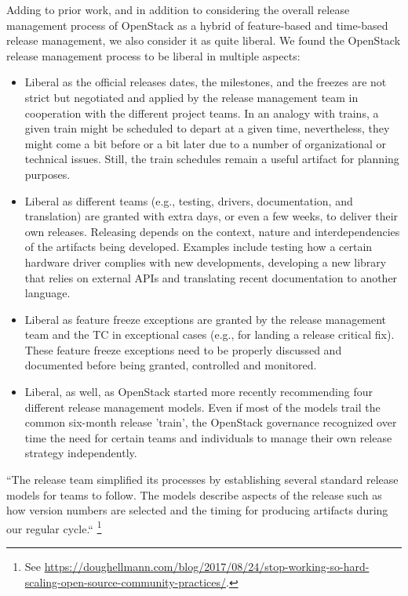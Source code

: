 \documentclass[dvipsnames]{interact}
\theoremstyle{plain}\newtheorem{theorem}{Theorem}[section]
\theoremstyle{definition}
\theoremstyle{remark}
\newenvironment{newStuff}{
    \begin{color}{Sepia}
    \begin{tabular}{|p{1.0\textwidth}|}
    \hline\\
    }
    { 
    \\\\\hline
    \end{tabular} 
    \end{color}
    }
\renewenvironment{newStuff}{}{}
\begin{document}
Adding to prior work, and in addition to considering the overall release management process of OpenStack as a hybrid of feature-based and time-based release management, we also consider it as quite liberal. We found the OpenStack release management process to be liberal in multiple aspects: 
\begin{itemize}
 \item Liberal as the official releases dates, the milestones, and the freezes are not strict but negotiated and applied by the release management team in cooperation with the different project teams. In an analogy with trains, a given train might be scheduled to depart at a given time, nevertheless, they might come a bit before or a bit later due to a number of organizational or technical issues. Still, the train schedules remain a useful artifact for planning purposes. 
 \item Liberal as different teams (e.g., testing, drivers, documentation, and translation) are granted with extra days, or even a few weeks, to deliver their own releases. Releasing depends on the context, nature and interdependencies of the artifacts being developed. Examples include testing how a certain hardware driver complies with new developments, developing a new library that relies on external APIs and translating recent documentation to another language. 
\item Liberal as feature freeze exceptions are granted by the release management team and the \ac{TC} in exceptional cases (e.g., for landing a release critical fix).  These feature freeze exceptions need to be properly discussed and documented before being granted, controlled and monitored. 

\item Liberal, as well, as OpenStack started more recently recommending four different release management models. Even if most of the models trail the common six-month release 'train', the OpenStack governance recognized over time the need for certain teams and individuals to manage their own release strategy independently. 

\end{itemize} 


\begin{newStuff}
 ``The release team simplified its processes by establishing several standard release models for teams to follow. The models describe aspects of the release such as how version numbers are selected and the timing for producing artifacts during our regular cycle.`` \footnote{See \url{https://doughellmann.com/blog/2017/08/24/stop-working-so-hard-scaling-open-source-community-practices/}.}
\end{newStuff}
\end{document}
